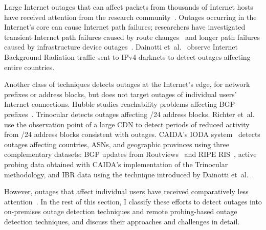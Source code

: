 
Large Internet outages that can affect packets from thousands of
Internet hosts have received attention from the research
community~\cite{censorship-outages, trinocular, hubble, paxson-e2e,
hubble, netdiagnoser, lifeguard, poiroot,
phillipa-outages-mailing-list, california-fault-lines,
delayed-routing-convergence, consensus-routing, routing-e2e-path-perf,
voip-bgp-convergence}. Outages occurring in the Internet's core can
cause Internet path failures; researchers have investigated transient
Internet path failures caused by route
changes~\cite{delayed-routing-convergence, consensus-routing,
routing-e2e-path-perf, voip-bgp-convergence} and longer path failures
caused by infrastructure device outages~\cite{paxson-e2e, hubble,
netdiagnoser, lifeguard, poiroot, phillipa-outages-mailing-list,
california-fault-lines}. Dainotti et~al.~\cite{dainotti-imc11} observe
Internet Background Radiation traffic sent to IPv4 darknets to detect
outages affecting entire countries.


Another class of techniques detects outages at the Internet's edge,
for network prefixes or address blocks, but
does not target outages of individual users' Internet
connections. Hubble studies reachability problems affecting BGP
prefixes~\cite{hubble}. Trinocular detects outages affecting /24
address blocks. Richter
et~al.~\cite{advancing-outage-art} use the observation point of a
large CDN to detect periods of reduced activity from /24 address
blocks consistent with outages. CAIDA's IODA
system~\cite{ioda-project-page} detects outages affecting countries, ASNs, and geographic provinces using three complementary
datasets: BGP updates from Routviews~\cite{routeviews} and RIPE RIS~\cite{ripe-ris}, active probing data
obtained with CAIDA's implementation of the Trinocular methodology,
and IBR data using the technique introduced by Dainotti et~al.~\cite{dainotti-imc11}. 


However, outages that affect individual users have received comparatively less
attention~\cite{pingin, grover2013peeking, disco, alwayson}. In the rest of this
section, I classify these efforts to detect outages into on-premises
outage detection techniques and remote probing-based outage detection
techniques, and
discuss their approaches and challenges in detail.

